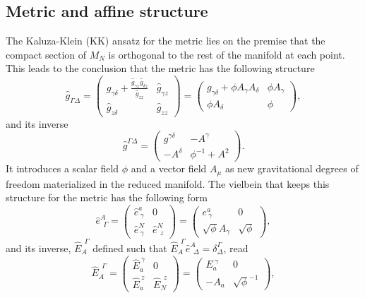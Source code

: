 \documentclass[aps,prd,12pt,superscriptaddress,showpacs,showkeys,longbibliography,reprint]{revtex4-1}
\begin{document}
\subsection{Metric and affine structure}
The Kaluza-Klein (KK) ansatz for the metric lies on the premise that the compact section of $M_N$ is orthogonal to the rest of the manifold at each point. This leads to the conclusion that the metric has the following structure
\begin{equation}
  \hat{g}_{\Gamma\Delta} =
  \begin{pmatrix}
    g_{\gamma\delta} +\frac{\hat{g}_{\gamma z}\hat{g}_{\delta z}}{\hat{g}_{zz}}&\hat{g}_{\gamma z}\\
    \hat{g}_{z\delta} & \hat{g}_{zz}
  \end{pmatrix}
  =
  \begin{pmatrix}
    g_{\gamma\delta} + \phi A_\gamma A_\delta&\phi A_\gamma\\
    \phi A_{\delta} & \phi
  \end{pmatrix},
\end{equation}
and its inverse
\begin{equation}
  \hat{g}^{\Gamma\Delta}=
  \begin{pmatrix}
    g^{\gamma\delta}&-A^\gamma\\
    -A^{\delta} & \phi^{-1}+A^2
  \end{pmatrix}.
\end{equation}
It introduces a scalar field $\phi$ and a vector field $A_\mu$ as new gravitational degrees of freedom materialized in the reduced manifold.
The vielbein that keeps this structure for the metric has the following form
\begin{equation}
  \label{Dvielbein}
  \hat{e}^A_{\ \ \Gamma} =
  \begin{pmatrix}
    \hat{e}^a_{\ \gamma}& 0\\
    \hat{e}^N_{\ \gamma} & \hat{e}^N_{\ \ z}
  \end{pmatrix}
  =
  \begin{pmatrix}
    e^a_{\ \gamma}& 0\\
    \sqrt{\phi}A_\gamma & \sqrt{\phi}
  \end{pmatrix},
\end{equation}
and its inverse, $\hat{E}_A^{\ \ \Gamma}$ defined such that $\hat{E}_A^{\ \ \Gamma}\hat{e}^A_{\ \ \Delta}=\delta^\Gamma_{\Delta}$, read
\begin{equation}
  \label{Dinversevielbein}
  \hat{E}_A^{\ \ \Gamma} =
  \begin{pmatrix}
    \hat{E}_a^{\ \gamma}& 0\\
    \hat{E}_a^{\ z} & \hat{E}_N^{\ \ z}
  \end{pmatrix}
  =
  \begin{pmatrix}
    E_a^{\ \gamma}& 0\\
    -A_a & \sqrt{\phi}^{-1}
  \end{pmatrix},
\end{equation}
\end{document}
